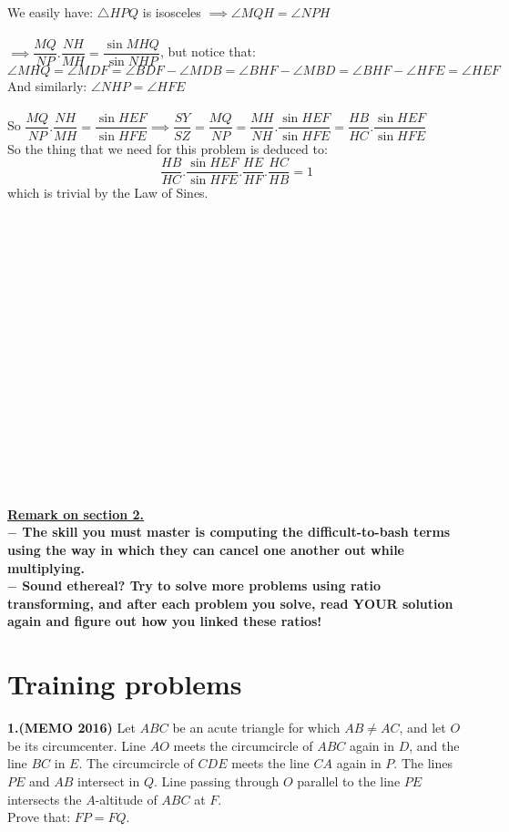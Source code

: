 \documentclass[a4paper,12pt,twoside]{book}
\begin{document}
{We easily have: $\triangle{HPQ}$ is isosceles $\implies \angle{MQH}=\angle{NPH}$\\\\
$\implies \dfrac{{MQ}}{{NP}}.\dfrac{{NH}}{{MH}} = \dfrac{{\sin MHQ}}{{\sin NHP}}$, but notice that: $\angle{MHQ}=\angle{MDF}=\angle{BDF}-\angle{MDB}=\angle{BHF}-\angle{MBD}=\angle{BHF}-\angle{HFE}=\angle{HEF}$
\\And similarly: $\angle{NHP}=\angle{HFE}$\\\\
So $\dfrac{{MQ}}{{NP}}.\dfrac{{NH}}{{MH}} = \dfrac{{\sin HEF}}{{\sin HFE}}\implies \dfrac{SY}{SZ}= \dfrac{{MQ}}{{NP}}=\dfrac{{MH}}{{NH}} .\dfrac{{\sin HEF}}{{\sin HFE}}=\dfrac{HB}{HC}.\dfrac{{\sin HEF}}{{\sin HFE}}$\\
So the thing that we need for this problem is deduced to:$$\dfrac{HB}{HC}.\dfrac{{\sin HEF}}{{\sin HFE}}.\dfrac{HE}{HF}.\dfrac{HC}{HB}=1$$
which is trivial by the Law of Sines.
\\\\\\\\\\\\\\\\\\\\\\\\\\\\\\\\\\\\
\textbf{\underline{\Large{Remark on section 2.}}}\\
\textbf{$-$ The skill you must master is computing the difficult-to-bash terms using the way in which they can cancel one another out while multiplying.\\$-$ Sound ethereal? Try to solve more problems using ratio transforming, and after each problem you solve, read YOUR solution again and figure out how you linked these ratios!}





\newpage
\section{Training problems}
\textbf{1.(MEMO 2016)} Let $ABC$ be an acute triangle for which $AB \neq AC$, and let $O$ be its circumcenter. Line $AO$ meets the circumcircle of $ABC$ again in $D$, and the line $BC$ in $E$. The circumcircle of $CDE$ meets the line $CA$ again in $P$. The lines $PE$ and $AB$ intersect in $Q$. Line passing through $O$ parallel to the line $PE$ intersects the $A$-altitude of $ABC$ at $F$.\\
Prove that: $FP = FQ$.\\

}
\end{document}
